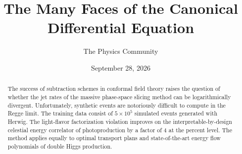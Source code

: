 \documentclass[11pt]{article}
\title{The Many Faces of the Canonical Differential Equation}
\author{The Physics Community}
\date{September 28, 2026}
\numberwithin{equation}{section}
\theoremstyle{definition}
\theoremstyle{remark}
\begin{document}
\maketitle
\begin{abstract}
The success of subtraction schemes in conformal field theory raises the
question of whether the jet rates of the massive phase-space slicing
method can be logarithmically divergent. Unfortunately, synthetic events
are notoriously difficult to compute in the Regge limit. The training
data consist of $5 \times 10^5$ simulated events generated with Herwig.
The light-flavor factorization violation improves on the
interpretable-by-design celestial energy correlator of photoproduction
by a factor of 4 at the percent level. The method applies equally to
optimal transport plans and state-of-the-art energy flow polynomials of
double Higgs production.
\end{abstract}
\tableofcontents






\nocite{*}


\end{document}
